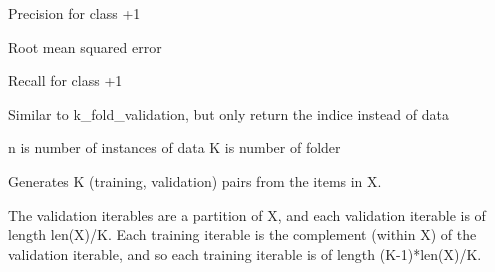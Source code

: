 \documentclass[letterpaper,10pt,english]{sphinxmanual}
\begin{document}

\begin{fulllineitems}
\label{pyGPs.Valid:pyGPs.Valid.valid.Prec}
Precision for class +1

\end{fulllineitems}


\begin{fulllineitems}
\label{pyGPs.Valid:pyGPs.Valid.valid.RMSE}
Root mean squared error

\end{fulllineitems}


\begin{fulllineitems}
\label{pyGPs.Valid:pyGPs.Valid.valid.Recall}
Recall for class +1

\end{fulllineitems}


\begin{fulllineitems}
\label{pyGPs.Valid:pyGPs.Valid.valid.k_fold_index}
Similar to k\_fold\_validation,
but only return the indice instead of data

n is number of instances of data
K is number of folder

\end{fulllineitems}


\begin{fulllineitems}
\label{pyGPs.Valid:pyGPs.Valid.valid.k_fold_validation}
Generates K (training, validation) pairs from the items in X.

The validation iterables are a partition of X, and each validation
iterable is of length len(X)/K. Each training iterable is the
complement (within X) of the validation iterable, and so each training
iterable is of length (K-1)*len(X)/K.

\end{fulllineitems}
\end{document}
